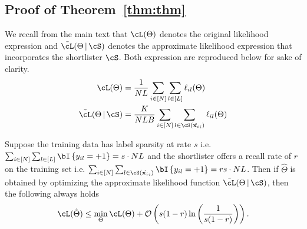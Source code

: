 \subsection{Proof of Theorem~\ref{thm:thm}}
\label{app:proof}
We recall from the main text that $\cL(\Theta)$ denotes the original likelihood expression and $\tilde\cL(\Theta \cond \cS)$ denotes the approximate likelihood expression that incorporates the shortlister $\cS$. Both expression are reproduced below for sake of clarity.
\begin{align*}
\cL(\Theta) &= \frac1{NL}\sum_{i \in [N]}\sum_{l \in [L]}\ell_{il}(\Theta)\\
\tilde\cL(\Theta \cond \cS) &= \frac{K}{NLB}\sum_{i \in [N]}\sum_{l \in \cS(\hat\vx_i)}\ell_{il}(\Theta)
\end{align*}

\begin{theorem}
\label{thm:thm-restated}
Suppose the training data has label sparsity at rate $s$ i.e. $\sum_{i \in [N]}\sum_{l \in [L]} \bI\bc{y_{il} = +1} = s\cdot NL$ and the shortlister offers a recall rate of $r$ on the training set i.e. $\sum_{i \in [N]}\sum_{l \in \cS(\hat\vx_i)}\bI\bc{y_{il} = +1} = rs\cdot NL$. Then if $\hat\Theta$ is obtained by optimizing the approximate likelihood function $\tilde\cL(\Theta \cond \cS)$, then the following always holds
\[
\cL(\hat\Theta) \leq \min_{\Theta} \cL(\Theta) + \bigO{s(1-r)\ln\br{\frac1{s(1-r)}}}.
\]
\end{theorem}

